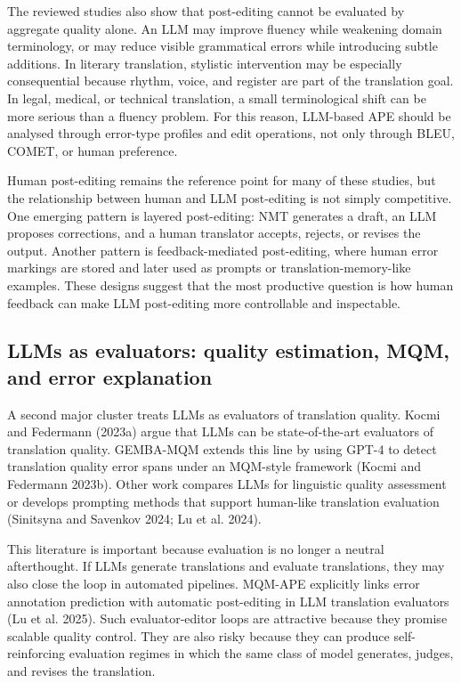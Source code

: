 \documentclass[11pt]{article}
\begin{document}
The reviewed studies also show that post-editing cannot be evaluated by aggregate quality alone. An LLM may improve fluency while weakening domain terminology, or may reduce visible grammatical errors while introducing subtle additions. In literary translation, stylistic intervention may be especially consequential because rhythm, voice, and register are part of the translation goal. In legal, medical, or technical translation, a small terminological shift can be more serious than a fluency problem. For this reason, LLM-based APE should be analysed through error-type profiles and edit operations, not only through BLEU, COMET, or human preference.

Human post-editing remains the reference point for many of these studies, but the relationship between human and LLM post-editing is not simply competitive. One emerging pattern is layered post-editing: NMT generates a draft, an LLM proposes corrections, and a human translator accepts, rejects, or revises the output. Another pattern is feedback-mediated post-editing, where human error markings are stored and later used as prompts or translation-memory-like examples. These designs suggest that the most productive question is how human feedback can make LLM post-editing more controllable and inspectable.


\subsection{LLMs as evaluators: quality estimation, MQM, and error explanation}
A second major cluster treats LLMs as evaluators of translation quality. Kocmi and Federmann (2023a) argue that LLMs can be state-of-the-art evaluators of translation quality. GEMBA-MQM extends this line by using GPT-4 to detect translation quality error spans under an MQM-style framework (Kocmi and Federmann 2023b). Other work compares LLMs for linguistic quality assessment or develops prompting methods that support human-like translation evaluation (Sinitsyna and Savenkov 2024; Lu et al. 2024).

This literature is important because evaluation is no longer a neutral afterthought. If LLMs generate translations and evaluate translations, they may also close the loop in automated pipelines. MQM-APE explicitly links error annotation prediction with automatic post-editing in LLM translation evaluators (Lu et al. 2025). Such evaluator-editor loops are attractive because they promise scalable quality control. They are also risky because they can produce self-reinforcing evaluation regimes in which the same class of model generates, judges, and revises the translation.
\end{document}
